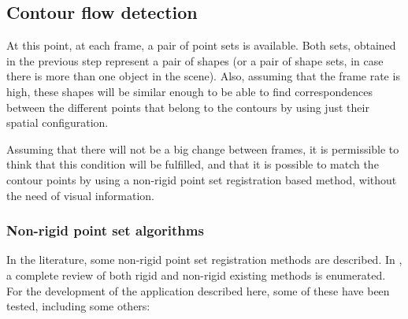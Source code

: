 \subsection{Contour flow detection}\label{ch:chapter02_01_02}

At this point, at each frame, a pair of point sets is available. Both sets, obtained in the previous step represent a pair of shapes (or a pair of shape sets, in case there is more than one object in the scene). Also, assuming that the frame rate is high, these shapes will be similar enough to be able to find correspondences between the different points that belong to the contours by using just their spatial configuration. 

Assuming that there will not be a big change between frames, it is permissible to think that this condition will be fulfilled, and that it is possible to match the contour points by using a non-rigid point set registration based method, without the need of visual information.

\subsubsection{Non-rigid point set algorithms}\label{ch:chapter02_01_02_01}

In the literature, some non-rigid point set registration methods are described. In \cite{myronenko2010point}, a complete review of both rigid and non-rigid existing methods is enumerated. For the development of the application described here, some of these have been tested, including some others:


